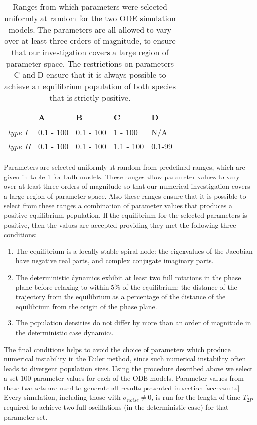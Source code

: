 \begin{center}
\begin{table}
\centering
    \begin{tabular}{| l | l | l | l | l |}

    \hline
     & A & B & C & D\\ \hline
    \emph{type I} & 0.1 - 100 & 0.1 - 100 & 1 - 100 & N/A \\ \hline
    \emph{type II} & 0.1 - 100 & 0.1 - 100 & 1.1 - 100 & 0.1-99 \\
    \hline
    \end{tabular}
\caption[Parameter ranges for \emph{type I} and \emph{type II} models.]{Ranges from which parameters were selected uniformly at random for the two ODE simulation models. The parameters are all allowed to vary over at least three orders of magnitude, to ensure that our investigation covers a large region of parameter space. The restrictions on parameters C and D ensure that it is always possible to achieve an equilibrium population of both species that is strictly positive.}
\label{table:p_range}    
\end{table}
\end{center}

Parameters are selected uniformly at random from predefined ranges, which are given in table \ref{table:p_range} for both models. These ranges allow parameter values to vary over at least three orders of magnitude so that our numerical investigation covers a large region of parameter space. Also these ranges ensure that it is possible to select from these ranges a combination of parameter values that produces a positive equilibrium population. If the equilibrium for the selected parameters is positive, then the values are accepted providing they met the following three conditions:
 
\begin{enumerate}
	\item The equilibrium is a locally stable spiral node: the eigenvalues of the Jacobian have negative real parts, and complex conjugate imaginary parts.
	\item The deterministic dynamics exhibit at least two full rotations in the phase plane before relaxing to within $5\%$ of the equilibrium: the distance of the trajectory from the equilibrium as a percentage of the distance of the equilibrium from the origin of the phase plane.
	\item The population densities do not differ by more than an order of magnitude in the deterministic case dynamics.
\end{enumerate}
%
The final conditions helps to avoid the choice of parameters which produce numerical instability in the Euler method, since such numerical instability often leads to divergent population sizes. Using the procedure described above we select a set 100 parameter values for each of the ODE models. Parameter values from these two sets are used to generate all results presented in section \ref{sec:results}. Every simulation, including those with $\sigma_{noise} \neq 0$, is run for the length of time $T_{2P}$ required to achieve two full oscillations (in the deterministic case) for that parameter set.

